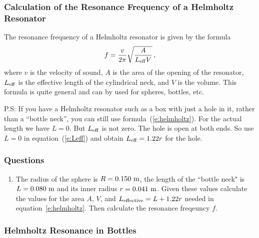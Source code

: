 \documentclass[11pt]{NSF}
\def\be{\begin{equation}}
\def\ee{\end{equation}}
\def\ben{\begin{enumerate}}
\def\een{\end{enumerate}}
\def\i{\item{}}
\begin{document}
\subsubsection{Calculation of the Resonance Frequency of a Helmholtz Resonator}

The resonance frequency of a Helmholtz resonator is given by the formula%
\be
f=\frac{v}{2\pi}\sqrt{\frac{A}{L_{\rm eff} V}}\,,
\label{e:helmholtz}
\ee
%
where $v$ is the velocity of sound, $A$ is the area of the opening of the 
resonator, $L_{\rm eff}$ is the effective length of the cylindrical neck, and 
$V$ is the volume. 
This formula is quite general and can by used for spheres, bottles, etc.

P.S: If you have a Helmholtz resonator such as a box with just a hole in it,
rather than a ``bottle neck”, you can still use formula~(\ref{e:helmholtz}). 
For the actual length we have $L = 0$. 
But $L_{\rm eff}$ is not zero. 
The hole is open at both ends. So use 
$L = 0$ in equation~(\ref{e:Leff}) and obtain 
$L_{\rm eff} = 1.22r$ for the hole.

\subsubsection*{Questions}
\ben
\i The radius of the sphere is $R=0.150~{\rm m}$, the length of the ``bottle neck" is 
$L=0.080~{\rm m}$ and its inner radius $r=0.041~{\rm m}$.
Given these values calculate the values for the area $A$, $V$, 
and $L_{\rm effective}=L+1.22 r$ needed in equation~\ref{e:helmholtz}.
Then calculate the resonance freqeuncy $f$.

\een

\subsubsection{Helmholtz Resonance in Bottles}
\end{document}
